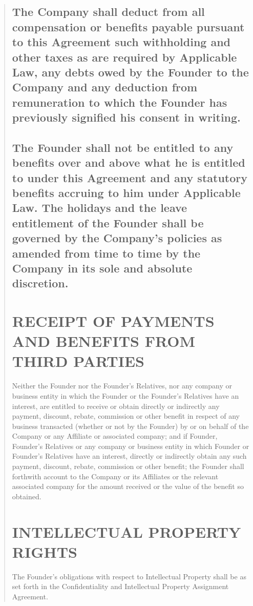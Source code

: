 \documentclass[
]{article}
\begin{document}
\begin{quote}
\subsection{The Company shall deduct from all compensation or benefits payable
pursuant to this Agreement such withholding and other taxes as are
required by Applicable Law, any debts owed by the Founder to the Company and any deduction from remuneration to which the Founder has previously
signified his consent in writing.}

\subsection{The Founder shall not be entitled to any benefits over and above what he is entitled to under this Agreement and any statutory benefits accruing to him under Applicable Law. The holidays and the leave entitlement of the Founder shall be governed by the Company's policies as amended from time to time by the Company in its sole and absolute discretion.}

\section{RECEIPT OF PAYMENTS AND BENEFITS FROM THIRD PARTIES}

Neither the Founder nor the Founder's Relatives, nor any company or
business entity in which the Founder or the Founder's Relatives have an
interest, are entitled to receive or obtain directly or indirectly any
payment, discount, rebate, commission or other benefit in respect of any
business transacted (whether or not by the Founder) by or on behalf of
the Company or any Affiliate or associated company; and if Founder,
Founder's Relatives or any company or business entity in which Founder
or Founder's Relatives have an interest, directly or indirectly obtain
any such payment, discount, rebate, commission or other benefit; the
Founder shall forthwith account to the Company or its Affiliates or the
relevant associated company for the amount received or the value of the
benefit so obtained.

\section{INTELLECTUAL PROPERTY RIGHTS}

The Founder's obligations with respect to Intellectual Property shall be
as set forth in the Confidentiality and Intellectual Property Assignment
Agreement.


\end{quote}
\end{document}
